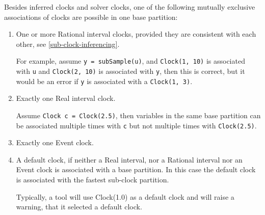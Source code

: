 Besides inferred clocks and solver clocks, one of the following mutually
exclusive associations of clocks are possible in one base partition:
\begin{enumerate}
\item
  One or more Rational interval clocks, provided they are consistent
  with each other, see \cref{sub-clock-inferencing}.
  \begin{nonnormative}
  For example, assume \lstinline!y = subSample(u)!, and \lstinline!Clock(1, 10)! is associated with \lstinline!u! and \lstinline!Clock(2, 10)! is associated with \lstinline!y!,
  then this is correct, but it would be an error if \lstinline!y! is associated with a \lstinline!Clock(1, 3)!.
  \end{nonnormative}
\item
  Exactly one Real interval clock.
  \begin{nonnormative}
  Assume \lstinline!Clock c = Clock(2.5)!, then variables in the same base partition can be associated multiple times with \lstinline!c! but not multiple times
  with \lstinline!Clock(2.5)!.
  \end{nonnormative}
\item
  Exactly one Event clock.
\item
  A default clock, if neither a Real interval, nor a Rational interval
  nor an Event clock is associated with a base partition. In this case
  the default clock is associated with the fastest sub-clock partition.
  \begin{nonnormative}
  Typically, a tool will use Clock(1.0) as a default clock and will raise a warning, that it selected a default clock.
  \end{nonnormative}
\end{enumerate}

